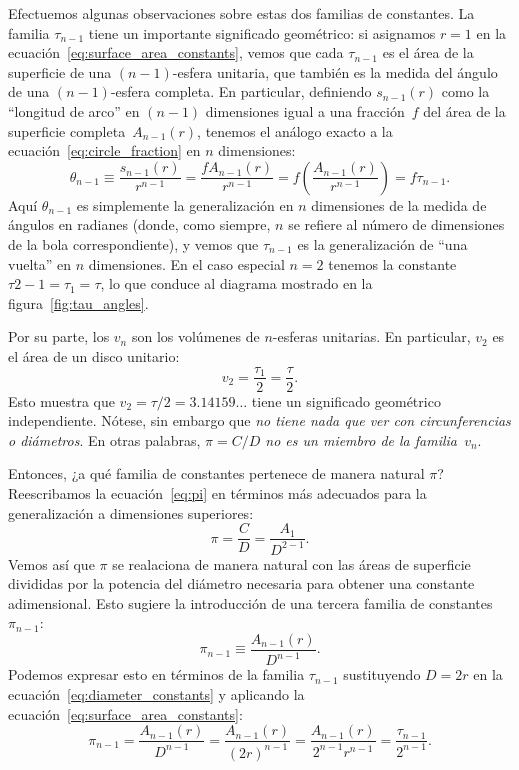 Efectuemos algunas observaciones sobre estas dos familias de constantes. La familia $\tau_{n-1}$ tiene un importante significado geométrico: si asignamos $r=1$ en la ecuación~\eqref{eq:surface_area_constants}, vemos que cada $\tau_{n-1}$ es el área de la superficie de una $(n-1)$-esfera unitaria, que también es la medida del ángulo de una $(n-1)$-esfera completa. En particular, definiendo $s_{n-1}(r)$ como la ``longitud de arco'' en $(n-1)$ dimensiones igual a una fracción~$f$ del área de la superficie completa~$A_{n-1}(r)$, tenemos el análogo exacto a la ecuación~\eqref{eq:circle_fraction} en $n$ dimensiones:
\[
\theta_{n-1} \equiv \frac{s_{n-1}(r)}{r^{n-1}} = \frac{f A_{n-1}(r)}{r^{n-1}} = f\left(\frac{A_{n-1}(r)}{r^{n-1}}\right) = f\tau_{n-1}.
\]
Aquí $\theta_{n-1}$ es simplemente la generalización en $n$ dimensiones de la medida de ángulos en radianes (donde, como siempre, $n$ se refiere al número de dimensiones de la bola correspondiente), y vemos que $\tau_{n-1}$ es la generalización de ``una vuelta'' en $n$ dimensiones. En el caso especial $n=2$ tenemos la constante $\tau{2-1 = \tau_1 = \tau}$, lo que conduce al diagrama mostrado en la figura~\ref{fig:tau_angles}. 

Por su parte, los $v_n$ son los volúmenes de $n$-esferas unitarias. En particular, $v_2$ es el área de un disco unitario:
\[
v_2 = \frac{\tau_1}{2} = \frac{\tau}{2}.
\]
Esto muestra que $v_2 = \tau/2 = 3.14159\ldots$ tiene un significado geométrico independiente. Nótese, sin embargo que \emph{no tiene nada que ver con circunferencias o diámetros}. En otras palabras, \emph{$\pi = C/D$ no es un miembro de la familia~$v_n$}.

Entonces, ¿a qué familia de constantes pertenece de manera natural $\pi$?
Reescribamos la ecuación~\eqref{eq:pi} en términos más adecuados para la generalización a dimensiones superiores:
\[
\pi = \frac{C}{D} = \frac{A_1}{D^{2-1}}.
\]
Vemos así que $\pi$ se realaciona de manera natural con las áreas de superficie divididas por la potencia del diámetro necesaria para obtener una constante adimensional. Esto sugiere la introducción de una tercera familia de constantes~$\pi_{n-1}$:
\begin{equation}
\label{eq:diameter_constants}
\pi_{n-1} \equiv \frac{A_{n-1}(r)}{D^{n-1}}.
\end{equation}
Podemos expresar esto en términos de la familia $\tau_{n-1}$ sustituyendo $D = 2r$ en la ecuación~\eqref{eq:diameter_constants} y aplicando la ecuación~\eqref{eq:surface_area_constants}:
\[
\pi_{n-1} = \frac{A_{n-1}(r)}{D^{n-1}} = \frac{A_{n-1}(r)}{(2r)^{n-1}} =
\frac{A_{n-1}(r)}{2^{n-1}r^{n-1}} = \frac{\tau_{n-1}}{2^{n-1}}.
\]

